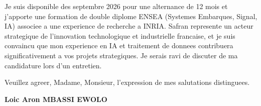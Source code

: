 \documentclass[a4paper,11pt]{article}
\begin{document}
Je suis disponible des septembre 2026 pour une alternance de 12 mois et j'apporte une formation de double diplome ENSEA (Systemes Embarques, Signal, IA) associee a une experience de recherche a INRIA. Safran represente un acteur strategique de l'innovation technologique et industrielle francaise, et je suis convaincu que mon experience en IA et traitement de donnees contribuera significativement a vos projets strategiques. Je serais ravi de discuter de ma candidature lors d'un entretien.

\vspace{1.5em}
\noindent Veuillez agreer, Madame, Monsieur, l'expression de mes salutations distinguees.

\vspace{2em}
\noindent \textbf{Loic Aron MBASSI EWOLO}
\end{document}
